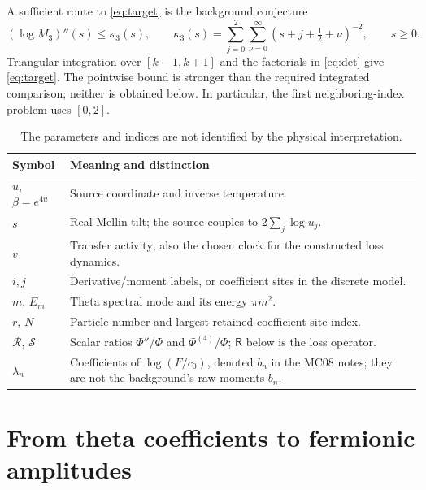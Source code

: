 \documentclass[11pt,letterpaper]{article}
\numberwithin{equation}{section}
\theoremstyle{remark}
\newcommand{\loss}{\mathsf R}
\newcommand{\srcR}{\mathscr R}
\newcommand{\srcS}{\mathscr S}
\begin{document}
A sufficient route to \eqref{eq:target} is the background conjecture
\begin{equation}
 (\log M_3)''(s)\le\kappa_3(s),\qquad
 \kappa_3(s)=\sum_{j=0}^2\sum_{\nu=0}^\infty
 (s+j+\tfrac12+\nu)^{-2},\qquad s\ge0. \label{eq:curvtarget}
\end{equation}
Triangular integration over $[k-1,k+1]$ and the factorials in
\eqref{eq:det} give \eqref{eq:target}. The pointwise bound is stronger
than the required integrated comparison; neither is obtained below.
In particular, the first neighboring-index problem uses $[0,2]$.

\begin{table}[htbp]
\centering\small
\renewcommand{\arraystretch}{1.16}
\begin{tabularx}{\textwidth}{@{}>{\raggedright\arraybackslash}p{}X@{}}
\toprule
Symbol & Meaning and distinction\\
\midrule
$u$, $\beta=e^{4u}$ & Source coordinate and inverse temperature.\\
$s$ & Real Mellin tilt; the source couples to $2\sum_j\log u_j$.\\
$v$ & Transfer activity; also the chosen clock for the constructed loss dynamics.\\
$i,j$ & Derivative/moment labels, or coefficient sites in the discrete model.\\
$m$, $E_m$ & Theta spectral mode and its energy $\pi m^2$.\\
$r$, $N$ & Particle number and largest retained coefficient-site index.\\
$\srcR$, $\srcS$ & Scalar ratios $\Phi''/\Phi$ and $\Phi^{(4)}/\Phi$; $\loss$ below is the loss operator.\\
$\lambda_n$ & Coefficients of $\log(F/c_0)$, denoted $b_n$ in the MC08 notes; they are not the background's raw moments $b_n$.\\
\bottomrule
\end{tabularx}
\caption{The parameters and indices are not identified by the physical interpretation.}
\label{tab:notation}
\end{table}

\section{From theta coefficients to fermionic amplitudes}
\label{sec:fermions}
\end{document}
